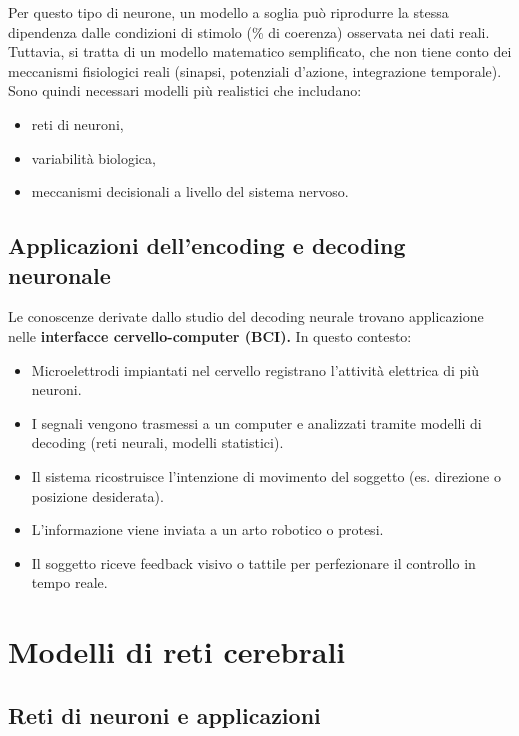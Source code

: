 \documentclass[12pt,a4paper,openany]{book}
\begin{document}
Per questo tipo di neurone, un modello a soglia può riprodurre la stessa dipendenza dalle condizioni di stimolo (\% di coerenza) osservata nei dati reali. Tuttavia, si tratta di un modello matematico semplificato, che non tiene conto dei meccanismi fisiologici reali (sinapsi, potenziali d'azione, integrazione temporale).
Sono quindi necessari modelli più realistici che includano:

\begin{itemize}
  \item reti di neuroni,
  \item variabilità biologica,
  \item meccanismi decisionali a livello del sistema nervoso.
\end{itemize}

\section{Applicazioni dell'encoding e decoding neuronale}

Le conoscenze derivate dallo studio del decoding neurale trovano applicazione nelle \textbf{interfacce cervello-computer (BCI).}
In questo contesto:

\begin{itemize}
  \item Microelettrodi impiantati nel cervello registrano l'attività elettrica di più neuroni.
  \item I segnali vengono trasmessi a un computer e analizzati tramite modelli di decoding (reti neurali, modelli statistici).
  \item Il sistema ricostruisce l'intenzione di movimento del soggetto (es. direzione o posizione desiderata).
  \item L'informazione viene inviata a un arto robotico o protesi.
  \item Il soggetto riceve feedback visivo o tattile per perfezionare il controllo in tempo reale.
\end{itemize}

\clearpage

\chapter{Modelli di reti cerebrali}
\section{Reti di neuroni e applicazioni}
\end{document}

